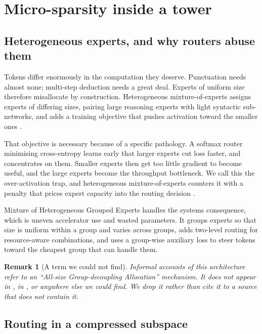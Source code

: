 \documentclass[11pt]{article}
\newtheorem{remark}{Remark}
\begin{document}
\section{Micro-sparsity inside a tower}
\label{sec:microsparsity}

\subsection{Heterogeneous experts, and why routers abuse them}

Tokens differ enormously in the computation they deserve. Punctuation needs almost none; multi-step deduction needs a great deal. Experts of uniform size therefore misallocate by construction. Heterogeneous mixture-of-experts assigns experts of differing sizes, pairing large reasoning experts with light syntactic sub-networks, and adds a training objective that pushes activation toward the smaller ones \cite{wang2024hmoe}.

That objective is necessary because of a specific pathology. A softmax router minimising cross-entropy learns early that larger experts cut loss faster, and concentrates on them. Smaller experts then get too little gradient to become useful, and the large experts become the throughput bottleneck. We call this the over-activation trap, and heterogeneous mixture-of-experts counters it with a penalty that prices expert capacity into the routing decision \cite{wang2024hmoe}.

Mixture of Heterogeneous Grouped Experts \cite{ma2026mohge} handles the systems consequence, which is uneven accelerator use and wasted parameters. It groups experts so that size is uniform within a group and varies across groups, adds two-level routing for resource-aware combinations, and uses a group-wise auxiliary loss to steer tokens toward the cheapest group that can handle them.

\begin{remark}[A term we could not find]
Informal accounts of this architecture refer to an ``All-size Group-decoupling Allocation'' mechanism. It does not appear in \cite{wang2024hmoe}, in \cite{ma2026mohge}, or anywhere else we could find. We drop it rather than cite it to a source that does not contain it.
\end{remark}

\subsection{Routing in a compressed subspace}
\label{sec:latentmoe}
\end{document}
